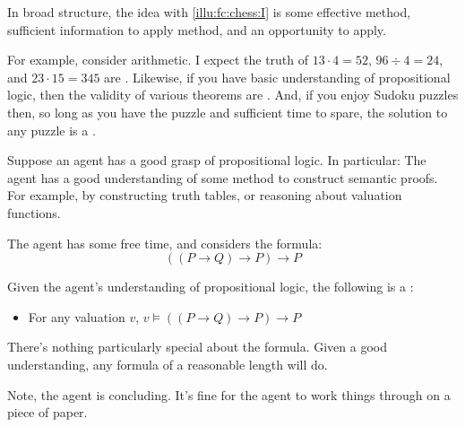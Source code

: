 \begin{note}
  In broad structure, the idea with \autoref{illu:fc:chess:I} is some effective method, sufficient information to apply method, and an opportunity to apply.

  For example, consider arithmetic.
  I expect the truth of \(13 \cdot 4 = 52\), \(96 \div 4 = 24\), and \(23 \cdot 15 = 345\) are .
  Likewise, if you have basic understanding of propositional logic, then the validity of various theorems are .
  And, if you enjoy Sudoku puzzles then, so long as you have the puzzle and sufficient time to spare, the solution to any puzzle is a \fc{}.
\end{note}

\begin{note}
  \begin{illustration}
    \label{illu:sketch:prop-logic}
    Suppose an agent has a good grasp of propositional logic.
    In particular:
    The agent has a good understanding of some method to construct semantic proofs.
    For example, by constructing truth tables, or reasoning about valuation functions.

    The agent has some free time, and considers the formula:
    \[
      ((P \rightarrow Q) \rightarrow P) \rightarrow P
    \]
  \end{illustration}

  Given the agent's understanding of propositional logic, the following is a \fc{}:
  \begin{itemize}
  \item
    For any valuation \(v\), \(v \vDash ((P \rightarrow Q) \rightarrow P) \rightarrow P \)
  \end{itemize}

  There's nothing particularly special about the formula.
  Given a good understanding, any formula of a reasonable length will do.

  Note, the agent is concluding.
  It's fine for the agent to work things through on a piece of paper.
\end{note}


